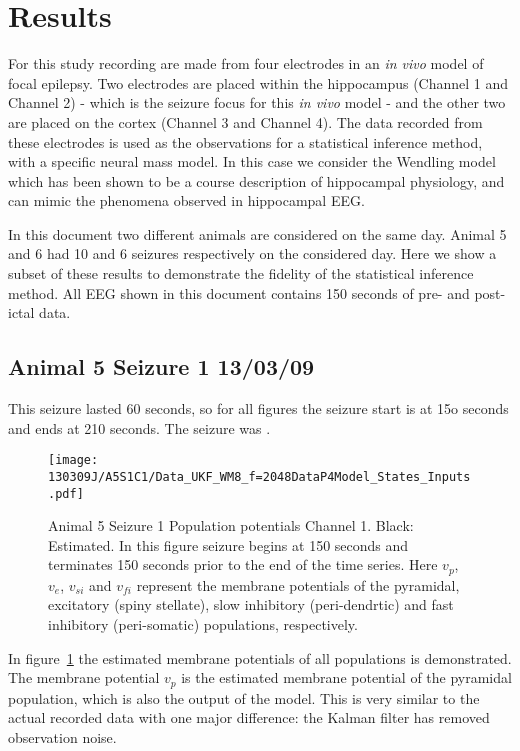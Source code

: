 \section{Results}

For this study recording are made from four electrodes in an \textsl{in vivo} model of focal epilepsy. Two electrodes are placed within the hippocampus (Channel 1 and Channel 2) - which is the seizure focus for this \textsl{in vivo} model - and the other two are placed on the cortex (Channel 3 and Channel 4). The data recorded from these electrodes is used as the observations for a statistical inference method, with a specific neural mass model. In this case we consider the Wendling model which has been shown to be a course description of hippocampal physiology, and can mimic the phenomena observed in hippocampal EEG.

In this document two different animals are considered on the same day. Animal 5 and 6 had 10 and 6 seizures respectively on the considered day. Here we show a subset of these results to demonstrate the fidelity of the statistical inference method. All EEG shown in this document contains 150 seconds of pre- and post-ictal data.

\subsection{Animal 5 Seizure 1 13/03/09}

This seizure lasted 60 seconds, so for all figures the seizure start is at 15o seconds and ends at 210 seconds. The seizure was .

\begin{figure}
	\centering
		\texttt{[image: 130309J/A5S1C1/Data\_UKF\_WM8\_f=2048DataP4Model\_States\_Inputs.pdf]}
	\caption{Animal 5 Seizure 1 Population potentials Channel 1. Black: Estimated. In this figure seizure begins at 150 seconds and terminates 150 seconds prior to the end of the time series. Here $v_{p}$, $v_{e}$, $v_{si}$ and $v_{fi}$ represent the membrane potentials of the pyramidal, excitatory (spiny stellate), slow inhibitory (peri-dendrtic) and fast inhibitory (peri-somatic) populations, respectively.}
	\label{fig: A5S1C1 PP}
\end{figure}

In figure~\ref{fig: A5S1C1 PP} the estimated membrane potentials of all populations is demonstrated. The membrane potential $v_p$ is the estimated membrane potential of the pyramidal population, which is also the output of the model. This is very similar to the actual recorded data with one major difference: the Kalman filter has removed observation noise. 

